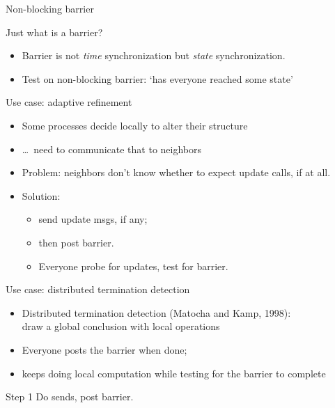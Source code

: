  {Non-blocking barrier}

\begin{numberedframe}{Just what is a barrier?}
  \begin{itemize}
  \item Barrier is not \emph{time} synchronization but \emph{state}
    synchronization.
  \item Test on non-blocking barrier: `has everyone reached some
    state'
  \end{itemize}
\end{numberedframe}

\begin{numberedframe}{Use case: adaptive refinement}
  \begin{itemize}
  \item Some processes decide locally to alter their structure
  \item \ldots~need to communicate that to neighbors
  \item Problem: neighbors don't know whether to expect update calls,
    if at all.
  \item Solution:
    \begin{itemize}
    \item send update msgs, if any;
    \item then post barrier.
    \item Everyone probe for updates, test for barrier.    
    \end{itemize}
  \end{itemize}
\end{numberedframe}

\begin{numberedframe}{Use case: distributed termination detection}
  \begin{itemize}
  \item Distributed termination detection (Matocha and Kamp, 1998):\\
    draw a global conclusion with local operations
  \item Everyone posts the barrier when done;
  \item keeps doing local computation while testing for the barrier to
    complete
  \end{itemize}
\end{numberedframe}


\begin{numberedframe}{Step 1}
  Do sends, post barrier.
\end{numberedframe}

